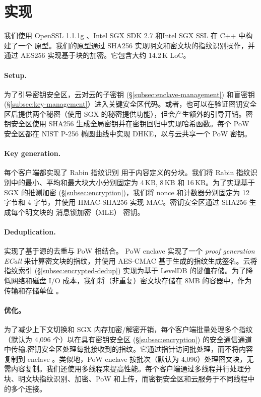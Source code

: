 \section{实现}
\label{sec:implementation}

我们使用 OpenSSL 1.1.1g \cite{openssl}、Intel SGX SDK 2.7 \cite{sgx} 和Intel SGX SSL \cite{sgxssl} 在 C++ 中构建了一个 \sysnameS 原型。我们的原型通过 SHA256 实现明文和密文块的指纹识别操作，并通过 AES256 实现基于块的加密。它包含大约 14.2\,K LoC。

\paragraph{Setup.} 
为了引导密钥安全区，云对云的子密钥 (\S\ref{subsec:enclave-management}) 和盲密钥 (\S\ref{subsec:key-management}）进入关键安全区代码。或者，\sysnameS 也可以在验证密钥安全区后提供两个秘密（使用 SGX \cite{sgx} 的秘密提供功能），但会产生额外的引导开销。密钥安全区使用 SHA256 生成全局密钥并在密钥回归中实现哈希函数。每个 PoW 安全区都在 NIST P-256 椭圆曲线中实现 DHKE，以与云共享一个 PoW 密钥。

\paragraph{Key generation.} 每个客户端都实现了 Rabin 指纹识别 \cite{rabin81} 用于内容定义的分块。我们将 Rabin 指纹识别中的最小、平均和最大块大小分别固定为 4\,KB, 8\,KB 和 16\,KB。为了实现基于 SGX 的推测加密 (\S\ref{subsec:encryption})，我们将 nonce 和计数器分别固定为 12 字节和 4 字节，并使用 HMAC-SHA256 实现 MAC。密钥安全区通过 SHA256 生成每个明文块的 消息锁加密（MLE） 密钥。

\paragraph{Deduplication.} \sysnameS 实现了基于源的去重与 PoW 相结合。 PoW enclave 实现了一个 \textit{ proof generation ECall} 来计算密文块的指纹，并使用 AES-CMAC 基于生成的指纹生成签名。云将指纹索引 (\S\ref{subsec:encrypted-dedup}) 实现为基于 LevelDB \cite{leveldb} 的键值存储。为了降低网络和磁盘 I/O 成本，我们将（非重复）密文块存储在 8MB 的容器中，作为传输和存储单位 \cite{lillibridge13}。

\paragraph{优化。} 为了减少上下文切换和 SGX 内存加密/解密开销，每个客户端批量处理多个指纹（默认为 4,096 个）以在具有密钥安全区 (\S\ref{subsec:encryption}) 的安全通信通道中传输.密钥安全区处理每批接收到的指纹。它通过指针访问批处理，而不将内容复制到 enclave \cite{harnik18}。类似地，PoW enclave 按批次（默认为 4,096）处理密文块，无需内容复制。我们还使用多线程来提高性能。每个客户端通过多线程并行处理分块、明文块指纹识别、加密、PoW 和上传，而密钥安全区和云服务于不同线程中的多个连接。